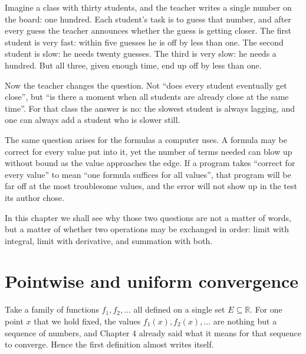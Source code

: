 \begin{untukanak}
Imagine a class with thirty students, and the teacher writes a single number
on the board: one hundred. Each student's task is to guess that number, and after every
guess the teacher announces whether the guess is getting closer. The first student is very
fast: within five guesses he is off by less than one. The second student is
slow: he needs twenty guesses. The third is very slow: he needs a hundred.
But all three, given enough time, end up off by less than one.

Now the teacher changes the question. Not ``does every student eventually get
close'', but ``is there a moment when all students are already close at the same
time''. For that class the answer is no: the slowest student is always
lagging, and one can always add a student who is slower still.

The same question arises for the formulas a computer uses. A formula
may be correct for every value put into it, yet the number of terms
needed can blow up without bound as the value approaches the edge. If a
program takes ``correct for every value'' to mean ``one formula suffices
for all values'', that program will be far off at the most troublesome values, and the
error will not show up in the test its author chose.

In this chapter we shall see why those two questions are not a matter of words,
but a matter of whether two operations may be exchanged in order: limit with
integral, limit with derivative, and summation with both.
\end{untukanak}

\section{Pointwise and uniform convergence}

Take a family of functions $f_1,f_2,\ldots$ all defined on a single
set $E\subseteq\mathbb{R}$. For one point $x$ that we hold fixed,
the values $f_1(x),f_2(x),\ldots$ are nothing but a sequence of numbers, and Chapter 4
already said what it means for that sequence to converge. Hence the first definition
almost writes itself.

